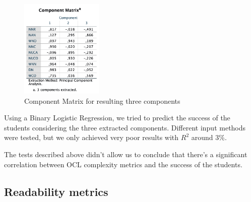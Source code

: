 \begin{figure}[ht]
\centering
\includegraphics[width=0.35\textwidth]{Chapters/figures/6_Results/Section2/02_FA_ComponentMatrix.png}
\caption{Component Matrix for resulting three components}
\label{fig:02_cm_oclmetrics}
\end{figure}

Using a Binary Logistic Regression, we tried to predict the success of the students considering the three extracted components. Different input methods were tested, but we only achieved very poor results with $R^{2}$ around 3\%.

The tests described above didn't allow us to conclude that there's a significant correlation between OCL complexity metrics and the success of the students.

\subsection{Readability metrics}

